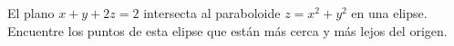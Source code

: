 \item El plano $x + y + 2z = 2$ intersecta al paraboloide $z = x^2 + y^2$ en una elipse. Encuentre los puntos de esta elipse que están más cerca y más lejos del origen.
